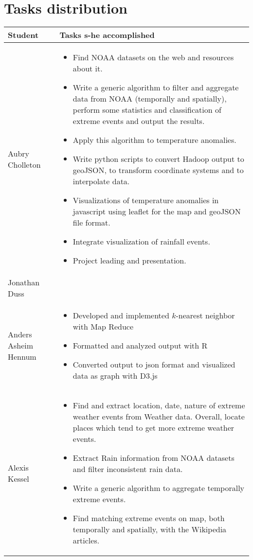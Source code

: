 \section{Tasks distribution}
\begin{longtable}{|l|p{10.5cm}|}
\hline
\textbf{Student} & \textbf{Tasks s-he accomplished} \\
\hline
Aubry Cholleton & \begin{itemize}
	\item Find NOAA datasets on the web and resources about it.
	\item Write a generic algorithm to filter and aggregate data from NOAA (temporally and spatially), perform some statistics and classification of extreme events and output the results.
	\item Apply this algorithm to temperature anomalies.
	\item Write python scripts to convert Hadoop output to geoJSON, to transform coordinate systems and to interpolate data.
	\item Visualizations of temperature anomalies in javascript using leaflet for the map and geoJSON file format.
	\item Integrate visualization of rainfall events.
	\item Project leading and presentation.
\end{itemize}\\
\hline
Jonathan Duss & \\
\hline
Anders Asheim Hennum & \begin{itemize}
	\item Developed and implemented $k$-nearest neighbor with Map Reduce
	\item Formatted and analyzed output with R
	\item Converted output to json format and visualized data as graph with D3.js
\end{itemize}\\
\hline
Alexis Kessel & \begin{itemize}
	\item Find and extract location, date, nature of extreme weather events from Weather data. Overall, locate places which tend to get more extreme weather events.
	\item Extract Rain information from NOAA datasets and filter inconsistent rain data.
	\item Write a generic algorithm to aggregate temporally extreme events.
	\item Find matching extreme events on map, both temporally and spatially, with the Wikipedia articles.

\end{itemize}
\end{longtable}
